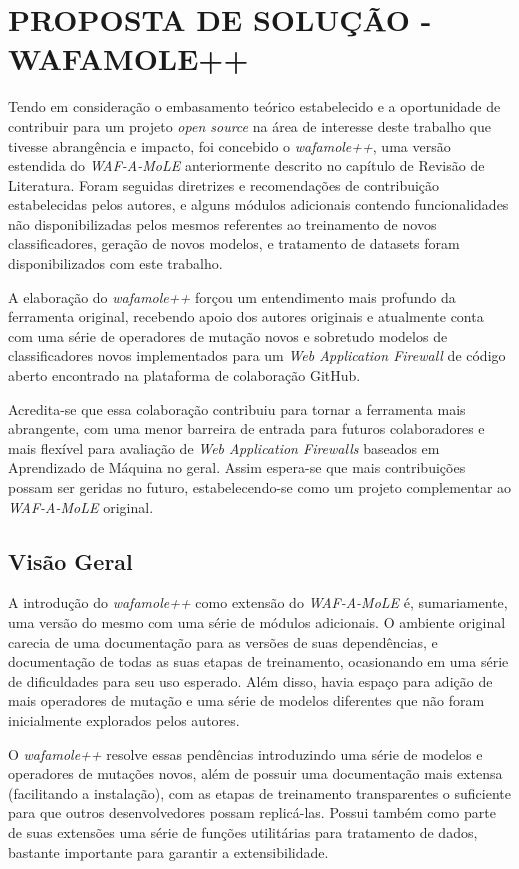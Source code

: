 \chapter{PROPOSTA DE SOLUÇÃO - WAFAMOLE++}
\label{chp:capitulo4}

Tendo em consideração o embasamento teórico estabelecido e a oportunidade de contribuir para um projeto \textit{open source} na área de interesse deste trabalho que tivesse abrangência e impacto, foi concebido o \textit{wafamole++}, uma versão estendida do \textit{WAF-A-MoLE} anteriormente descrito no capítulo de Revisão de Literatura. Foram seguidas diretrizes e recomendações de contribuição estabelecidas pelos autores, e alguns módulos adicionais contendo funcionalidades não disponibilizadas pelos mesmos referentes ao treinamento de novos classificadores, geração de novos modelos, e tratamento de datasets foram disponibilizados com este trabalho.

A elaboração do \textit{wafamole++} forçou um entendimento mais profundo da ferramenta original, recebendo apoio dos autores originais e atualmente conta com uma série de operadores de mutação novos e sobretudo modelos de classificadores novos implementados para um \textit{Web Application Firewall} de código aberto encontrado na plataforma de colaboração GitHub.

Acredita-se que essa colaboração contribuiu para tornar a ferramenta mais abrangente, com uma menor barreira de entrada para futuros colaboradores e mais flexível para avaliação de \textit{Web Application Firewalls} baseados em Aprendizado de Máquina no geral. Assim espera-se que mais contribuições possam ser geridas no futuro, estabelecendo-se como um projeto complementar ao \textit{WAF-A-MoLE} original.

\section{Visão Geral}
A introdução do \textit{wafamole++} como extensão do \textit{WAF-A-MoLE} é, sumariamente, uma versão do mesmo com uma série de módulos adicionais. O ambiente original carecia de uma documentação para as versões de suas dependências, e documentação de todas as suas etapas de treinamento, ocasionando em uma série de dificuldades para seu uso esperado. Além disso, havia espaço para adição de mais operadores de mutação e uma série de modelos diferentes que não foram inicialmente explorados pelos autores.

O \textit{wafamole++} resolve essas pendências introduzindo uma série de modelos e operadores de mutações novos, além de possuir uma documentação mais extensa (facilitando a instalação), com as etapas de treinamento transparentes o suficiente para que outros desenvolvedores possam replicá-las. Possui também como parte de suas extensões uma série de funções utilitárias para tratamento de dados, bastante importante para garantir a extensibilidade. 

